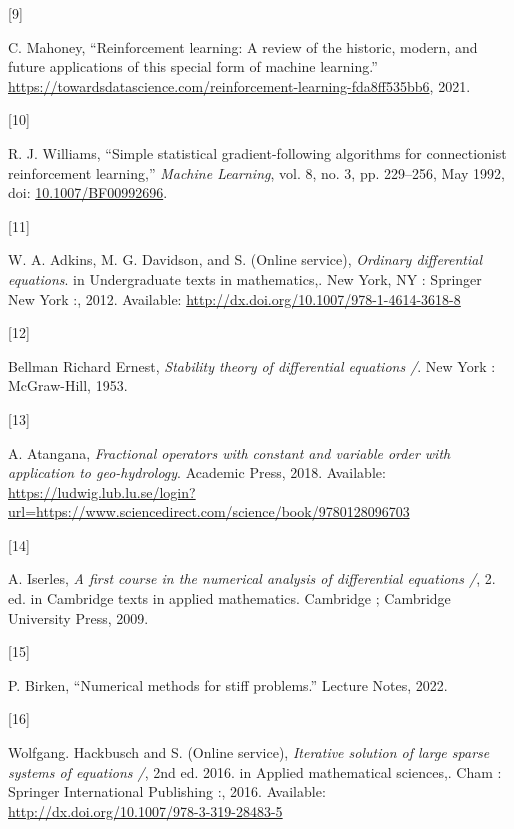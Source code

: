 \documentclass[
  letterpaper,
]{report}
\newlength{\cslhangindent}
\newlength{\csllabelwidth}
\newenvironment{CSLReferences}[2] %
 {\begin{list}{}{%
  \setlength{\itemindent}{0pt}
  \setlength{\leftmargin}{0pt}
  \setlength{\parsep}{0pt}
  \ifodd #1
   \setlength{\leftmargin}{\cslhangindent}
   \setlength{\itemindent}{-1\cslhangindent}
  \fi
  \setlength{\itemsep}{#2\baselineskip}}}
 {\end{list}}
\newcommand{\CSLLeftMargin}[1]{\parbox[t]{\csllabelwidth}{\strut#1\strut}}
\newcommand{\CSLRightInline}[1]{\parbox[t]{\linewidth - \csllabelwidth}{\strut#1\strut}}
\theoremstyle{definition}
\theoremstyle{plain}
\theoremstyle{definition}
\theoremstyle{remark}
\begin{document}
\begin{CSLReferences}{0}{0}
\CSLLeftMargin{{[}9{]} }%
\CSLRightInline{C. Mahoney, {``Reinforcement learning: A review of the
historic, modern, and future applications of this special form of
machine learning.''}
\url{https://towardsdatascience.com/reinforcement-learning-fda8ff535bb6},
2021.}

\CSLLeftMargin{{[}10{]} }%
\CSLRightInline{R. J. Williams, {``Simple statistical gradient-following
algorithms for connectionist reinforcement learning,''} \emph{Machine
Learning}, vol. 8, no. 3, pp. 229--256, May 1992, doi:
\href{https://doi.org/10.1007/BF00992696}{10.1007/BF00992696}.}

\CSLLeftMargin{{[}11{]} }%
\CSLRightInline{W. A. Adkins, M. G. Davidson, and S. (Online service),
\emph{Ordinary differential equations}. in Undergraduate texts in
mathematics,. New York, NY : Springer New York :, 2012. Available:
\url{http://dx.doi.org/10.1007/978-1-4614-3618-8}}

\CSLLeftMargin{{[}12{]} }%
\CSLRightInline{Bellman Richard Ernest, \emph{Stability theory of
differential equations /}. New York : McGraw-Hill, 1953.}

\CSLLeftMargin{{[}13{]} }%
\CSLRightInline{A. Atangana, \emph{Fractional operators with constant
and variable order with application to geo-hydrology}. Academic Press,
2018. Available:
\url{https://ludwig.lub.lu.se/login?url=https://www.sciencedirect.com/science/book/9780128096703}}

\CSLLeftMargin{{[}14{]} }%
\CSLRightInline{A. Iserles, \emph{A first course in the numerical
analysis of differential equations /}, 2. ed. in Cambridge texts in
applied mathematics. Cambridge ; Cambridge University Press, 2009.}

\CSLLeftMargin{{[}15{]} }%
\CSLRightInline{P. Birken, {``Numerical methods for stiff problems.''}
Lecture Notes, 2022.}

\CSLLeftMargin{{[}16{]} }%
\CSLRightInline{Wolfgang. Hackbusch and S. (Online service),
\emph{Iterative solution of large sparse systems of equations /}, 2nd
ed. 2016. in Applied mathematical sciences,. Cham : Springer
International Publishing :, 2016. Available:
\url{http://dx.doi.org/10.1007/978-3-319-28483-5}}


\end{CSLReferences}
\end{document}
